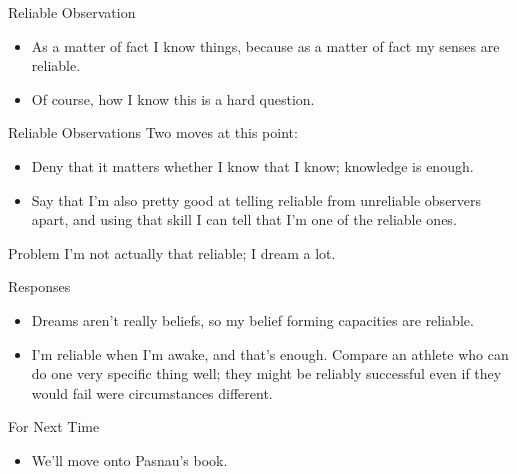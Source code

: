 \documentclass[
  17pt,
  letterpaper,
  ignorenonframetext,
  aspectratio=169,
]{beamer}
\providecommand{\tightlist}{%
  \setlength{\itemsep}{0pt}\setlength{\parskip}{0pt}}\usepackage{longtable,booktabs,array}
\begin{document}
\begin{frame}{Reliable Observation}
\protect\hypertarget{reliable-observation}{}
\begin{itemize}[<+->]
\tightlist
\item
  As a matter of fact I know things, because as a matter of fact my
  senses are reliable.
\item
  Of course, how I know this is a hard question.
\end{itemize}
\end{frame}

\begin{frame}{Reliable Observations}
\protect\hypertarget{reliable-observations}{}
Two moves at this point:

\begin{itemize}[<+->]
\tightlist
\item
  Deny that it matters whether I know that I know; knowledge is enough.
\item
  Say that I'm also pretty good at telling reliable from unreliable
  observers apart, and using that skill I can tell that I'm one of the
  reliable ones.
\end{itemize}
\end{frame}

\begin{frame}{Problem}
\protect\hypertarget{problem}{}
I'm not actually that reliable; I dream a lot.
\end{frame}

\begin{frame}{Responses}
\protect\hypertarget{responses}{}
\begin{itemize}[<+->]
\tightlist
\item
  Dreams aren't really beliefs, so my belief forming capacities are
  reliable.
\item
  I'm reliable when I'm awake, and that's enough. Compare an athlete who
  can do one very specific thing well; they might be reliably successful
  even if they would fail were circumstances different.
\end{itemize}
\end{frame}

\begin{frame}{For Next Time}
\protect\hypertarget{for-next-time}{}
\begin{itemize}[<+->]
\tightlist
\item
  We'll move onto Pasnau's book.
\end{itemize}
\end{frame}
\end{document}
